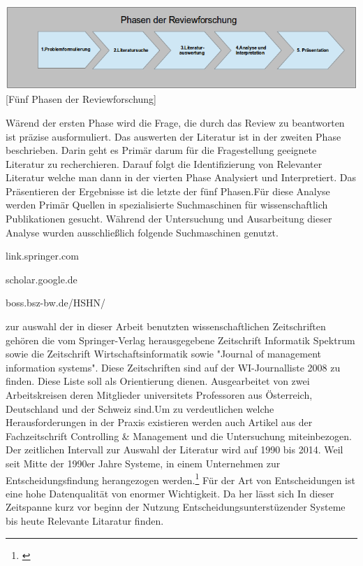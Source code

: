 \documentclass[12pt,a4paper,bibliography=totocnumbered,listof=totocnumbered]{scrartcl}
\begin{document}
\vspace{1em}
\begin{minipage}{\linewidth}
	\centering
	\includegraphics[width=1\linewidth]{Bilder/phasen.png}
	[Fünf Phasen der Reviewforschung]
	\label{Fünf Phasen der Reviewforschung}
\end{minipage}

Wärend der ersten Phase wird die Frage, die durch das Review zu beantworten
ist präzise ausformuliert. Das auswerten der Literatur ist in der zweiten Phase beschrieben. Darin geht es Primär darum für die Fragestellung geeignete Literatur zu recherchieren. Darauf folgt die Identifizierung von Relevanter Literatur welche man dann in der vierten Phase Analysiert und Interpretiert. Das Präsentieren der Ergebnisse ist die letzte der fünf Phasen.Für diese Analyse werden Primär Quellen in spezialisierte Suchmaschinen für wissenschaftlich Publikationen gesucht. Während der Untersuchung und Ausarbeitung dieser Analyse wurden ausschließlich folgende
Suchmaschinen genutzt.
\begin{compactitem}
	\item link.springer.com
	\item scholar.google.de
	\item boss.bsz-bw.de/HSHN/
\end{compactitem}
zur auswahl der in dieser Arbeit benutzten wissenschaftlichen Zeitschriften  gehören die vom Springer-Verlag herausgegebene Zeitschrift Informatik Spektrum sowie die Zeitschrift Wirtschaftsinformatik sowie "Journal of management information systems". Diese Zeitschriften sind auf der WI-Journalliste 2008 zu finden. Diese Liste soll als Orientierung dienen. Ausgearbeitet von  zwei Arbeitskreisen deren Mitglieder universitets Professoren aus Österreich, Deutschland und der Schweiz sind\cite{WiLis}.Um zu verdeutlichen welche Herausforderungen in der Praxis existieren werden auch Artikel aus der Fachzeitschrift Controlling & Management und die Untersuchung miteinbezogen.
Der zeitlichen Intervall zur Auswahl der Literatur wird auf 1990 bis 2014. Weil seit Mitte der 1990er Jahre Systeme, in einem Unternehmen zur Entscheidungsfindung herangezogen werden.\footnote{\cite{Humm}} Für der Art von Entscheidungen ist eine hohe Datenqualität von enormer Wichtigkeit. Da her lässt sich In dieser Zeitspanne kurz vor beginn der Nutzung Entscheidungsunterstüzender Systeme bis heute Relevante Litaratur finden.
\end{document}
